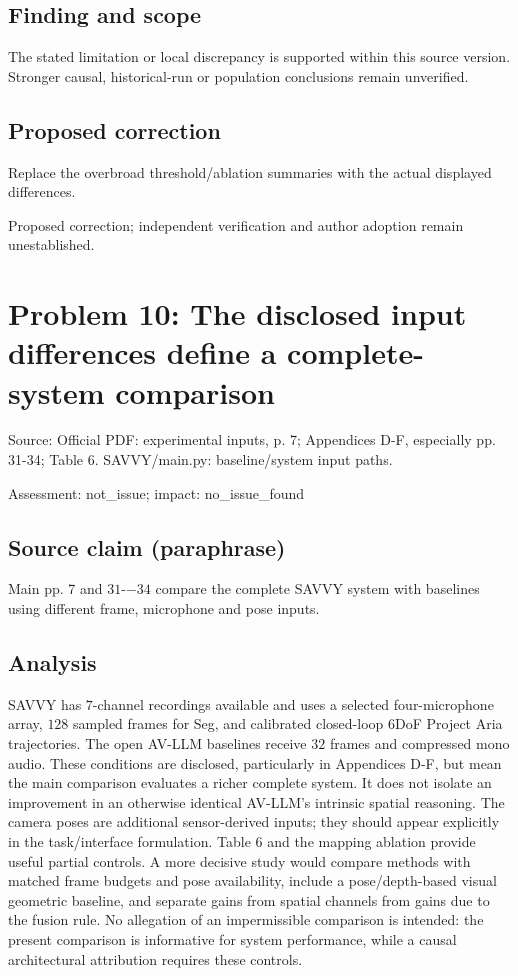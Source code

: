 \documentclass[11pt]{article}
\begin{document}
\subsection*{Finding and scope}

The stated limitation or local discrepancy is supported within this source version. Stronger causal, historical-run or population conclusions remain unverified.

\subsection*{Proposed correction}

Replace the overbroad threshold/ablation summaries with the actual displayed differences.

Proposed correction; independent verification and author adoption remain unestablished.

\section*{Problem 10: The disclosed input differences define a complete-system comparison}

Source: Official PDF: experimental inputs, p. 7; Appendices D-F, especially pp. 31-34; Table 6. SAVVY/main.py: baseline/system input paths.

Assessment: not\_issue; impact: no\_issue\_found

\subsection*{Source claim (paraphrase)}

Main pp. 7 and \(31\)-\(-34\) compare the complete SAVVY system with baselines using different frame, microphone and pose inputs.

\subsection*{Analysis}

SAVVY has \(7\)-channel recordings available and uses a selected four-microphone array, \(128\) sampled frames for Seg, and calibrated closed-loop 6DoF Project Aria trajectories. The open AV-LLM baselines receive \(32\) frames and compressed mono audio. These conditions are disclosed, particularly in Appendices D-F, but mean the main comparison evaluates a richer complete system. It does not isolate an improvement in an otherwise identical AV-LLM's intrinsic spatial reasoning. The camera poses are additional sensor-derived inputs; they should appear explicitly in the task/interface formulation. Table 6 and the mapping ablation provide useful partial controls. A more decisive study would compare methods with matched frame budgets and pose availability, include a pose/depth-based visual geometric baseline, and separate gains from spatial channels from gains due to the fusion rule. No allegation of an impermissible comparison is intended: the present comparison is informative for system performance, while a causal architectural attribution requires these controls.
\end{document}
